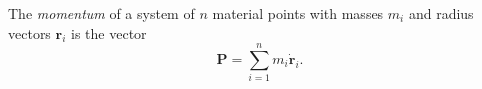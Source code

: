 The \textit{momentum} of a system of $n$ material points with masses $m_i$ and radius vectors $\mathbf{r}_i$ is the vector
$$\mathbf{P} = \sum_{i=1}^{n} m_i \dot{\mathbf{r}}_i.$$
